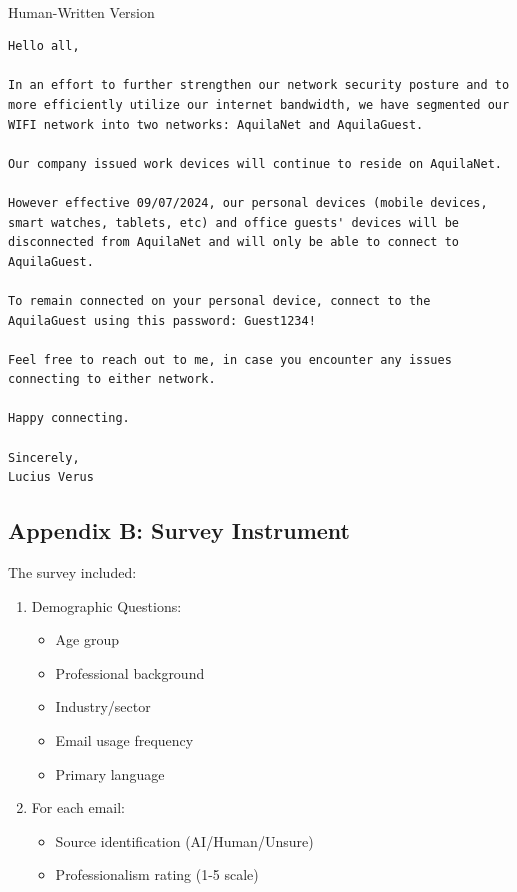 \documentclass[
  letterpaper,
  DIV=11,
  numbers=noendperiod]{scrartcl}
\makeatletter
\let\oldparagraph\paragraph
\renewcommand{\paragraph}{
    \@ifstar
      \xxxParagraphStar
      \xxxParagraphNoStar
  }
\newcommand{\xxxParagraphStar}[1]{\oldparagraph*{#1}\mbox{}}
\newcommand{\xxxParagraphNoStar}[1]{\oldparagraph{#1}\mbox{}}
\providecommand{\tightlist}{%
  \setlength{\itemsep}{0pt}\setlength{\parskip}{0pt}}\usepackage{longtable,booktabs,array}
\makeatother
\begin{document}
\paragraph{Human-Written Version}\label{human-written-version-3}

\begin{verbatim}
Hello all,

In an effort to further strengthen our network security posture and to more efficiently utilize our internet bandwidth, we have segmented our WIFI network into two networks: AquilaNet and AquilaGuest.

Our company issued work devices will continue to reside on AquilaNet.

However effective 09/07/2024, our personal devices (mobile devices, smart watches, tablets, etc) and office guests' devices will be disconnected from AquilaNet and will only be able to connect to AquilaGuest.

To remain connected on your personal device, connect to the AquilaGuest using this password: Guest1234!

Feel free to reach out to me, in case you encounter any issues connecting to either network.

Happy connecting.

Sincerely,
Lucius Verus
\end{verbatim}

\subsection{Appendix B: Survey
Instrument}\label{appendix-b-survey-instrument}

The survey included:

\begin{enumerate}
\def\labelenumi{\arabic{enumi}.}
\tightlist
\item
  Demographic Questions:

  \begin{itemize}
  \tightlist
  \item
    Age group
  \item
    Professional background
  \item
    Industry/sector
  \item
    Email usage frequency
  \item
    Primary language
  \end{itemize}
\item
  For each email:

  \begin{itemize}
  \tightlist
  \item
    Source identification (AI/Human/Unsure)
  \item
    Professionalism rating (1-5 scale)
  \end{itemize}
\end{enumerate}
\end{document}
